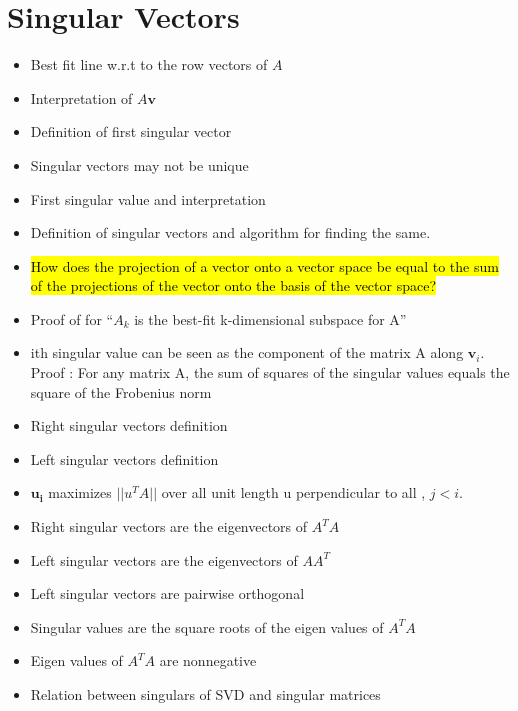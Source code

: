 \documentclass[12pt]{article}
\newcommand{\norm}[1]{||{#1}||}
\begin{document}
\section{Singular Vectors}
\begin{itemize}

\item
Best fit line w.r.t to the row vectors of $A$

\item
Interpretation of $A \mathbf v$
 
\item
Definition of first singular vector

\item
Singular vectors may not be unique

\item
First singular value and interpretation

\item
Definition of singular vectors and algorithm for finding the same.

\item
\hl{How does the projection of a vector onto a vector space be equal to the sum of the projections of the vector onto the basis of the vector space?}

\item
Proof of for ``$A_k$ is the best-fit k-dimensional subspace for A''

\item
ith singular value can be seen as the component of the matrix A along $\mathbf v_i$. Proof : For any matrix A, the sum of squares of the singular values equals the square of the Frobenius norm

\item
Right singular vectors definition

\item
Left singular vectors definition

\item
$\mathbf{u_i}$ maximizes $\norm{u^T  A}$ over all unit length u perpendicular to all  , $j < i$.

\item
Right singular vectors are the eigenvectors of $A^T A$

\item
Left singular vectors are the eigenvectors of  $AA^T$

\item
Left singular vectors are pairwise orthogonal

\item
Singular values are the square roots of the eigen values of $A^T A$

\item
Eigen values of $A^T A$ are nonnegative

\item
Relation between singulars of SVD and singular matrices

\end{itemize}
\end{document}
